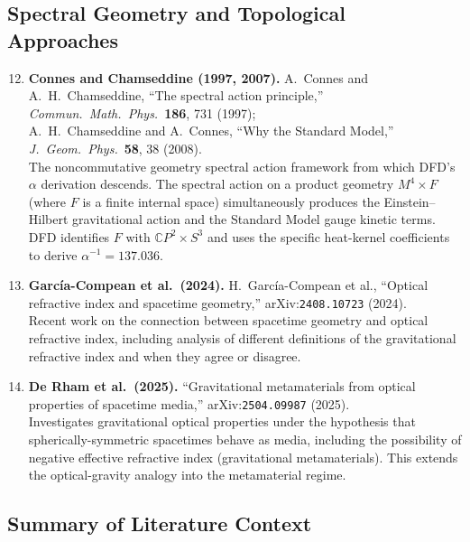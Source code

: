\documentclass[11pt]{article}
\newcommand{\CP}{\mathbb{C}P}
\theoremstyle{plain}
\theoremstyle{definition}
\theoremstyle{remark}
\begin{document}
\subsection{Spectral Geometry and Topological Approaches}

\begin{enumerate}
\setcounter{enumi}{11}

\item \textbf{Connes and Chamseddine (1997, 2007).}
A.~Connes and A.~H.~Chamseddine, ``The spectral action principle,''
\textit{Commun.\ Math.\ Phys.}\ \textbf{186}, 731 (1997);\\
A.~H.~Chamseddine and A.~Connes, ``Why the Standard Model,''
\textit{J.\ Geom.\ Phys.}\ \textbf{58}, 38 (2008).\\
The noncommutative geometry spectral action framework from which
DFD's $\alpha$ derivation descends. The spectral action on a product
geometry $M^4 \times F$ (where $F$ is a finite internal space)
simultaneously produces the Einstein--Hilbert gravitational action and
the Standard Model gauge kinetic terms. DFD identifies $F$ with
$\CP^2 \times S^3$ and uses the specific heat-kernel coefficients to
derive $\alpha^{-1} = 137.036$.

\item \textbf{Garc\'{i}a-Compean et al.\ (2024).}
H.~Garc\'{i}a-Compean et al., ``Optical refractive index and spacetime
geometry,'' arXiv:\texttt{2408.10723} (2024).\\
Recent work on the connection between spacetime geometry and optical
refractive index, including analysis of different definitions of the
gravitational refractive index and when they agree or disagree.

\item \textbf{De Rham et al.\ (2025).}
``Gravitational metamaterials from optical properties of spacetime
media,'' arXiv:\texttt{2504.09987} (2025).\\
Investigates gravitational optical properties under the hypothesis
that spherically-symmetric spacetimes behave as media, including
the possibility of negative effective refractive index (gravitational
metamaterials). This extends the optical-gravity analogy into the
metamaterial regime.

\end{enumerate}

\subsection{Summary of Literature Context}
\end{document}
